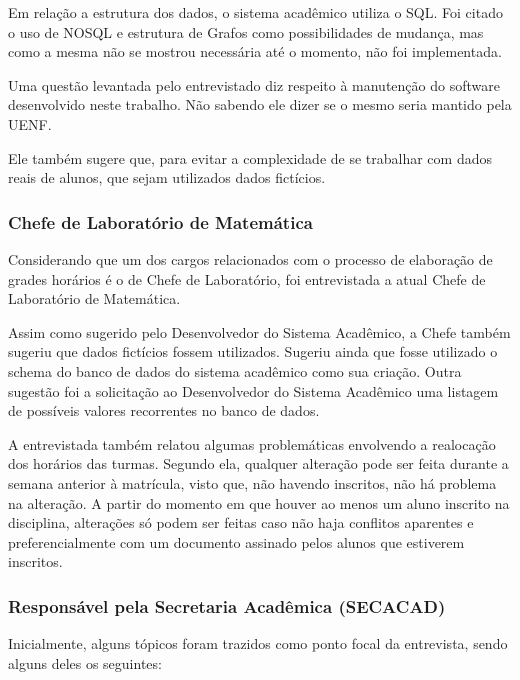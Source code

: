         Em relação a estrutura dos dados, o sistema acadêmico utiliza o SQL. Foi citado o uso de NOSQL e estrutura de Grafos como possibilidades de mudança, mas como a mesma não se mostrou necessária até o momento, não foi implementada.

        Uma questão levantada pelo entrevistado diz respeito à manutenção do software desenvolvido neste trabalho. Não sabendo ele dizer se o mesmo seria mantido pela UENF.

        Ele também sugere que, para evitar a complexidade de se trabalhar com dados reais de alunos, que sejam utilizados dados fictícios.

    \subsubsection{Chefe de Laboratório de Matemática} %

        Considerando que um dos cargos relacionados com o processo de elaboração de grades horários é o de Chefe de Laboratório, foi entrevistada a atual Chefe de Laboratório de Matemática.

        Assim como sugerido pelo Desenvolvedor do Sistema Acadêmico, a Chefe também sugeriu que dados fictícios fossem utilizados. Sugeriu ainda que fosse utilizado o schema do banco de dados do sistema acadêmico como sua criação. Outra sugestão foi a solicitação ao Desenvolvedor do Sistema Acadêmico uma listagem de possíveis valores recorrentes no banco de dados.

        A entrevistada também relatou algumas problemáticas envolvendo a realocação dos horários das turmas. Segundo ela, qualquer alteração pode ser feita durante a semana anterior à matrícula, visto que, não havendo inscritos, não há problema na alteração. A partir do momento em que houver ao menos um aluno inscrito na disciplina, alterações só podem ser feitas caso não haja conflitos aparentes e preferencialmente com um documento assinado pelos alunos que estiverem inscritos.

    \subsubsection{Responsável pela Secretaria Acadêmica (SECACAD)} %

        Inicialmente, alguns tópicos foram trazidos como ponto focal da entrevista, sendo alguns deles os seguintes:

